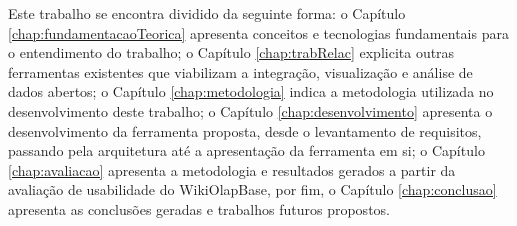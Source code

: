 Este trabalho se encontra dividido da seguinte forma: o Capítulo 
\ref{chap:fundamentacaoTeorica} apresenta conceitos e tecnologias fundamentais para o 
entendimento do trabalho; o Capítulo \ref{chap:trabRelac} explicita outras ferramentas 
existentes que viabilizam a integração, visualização e análise de dados abertos; o 
Capítulo \ref{chap:metodologia} indica a metodologia utilizada no desenvolvimento deste 
trabalho; o Capítulo \ref{chap:desenvolvimento} apresenta o desenvolvimento da ferramenta 
proposta, desde o levantamento de requisitos, passando pela arquitetura até a 
apresentação da ferramenta em si; o Capítulo \ref{chap:avaliacao} apresenta a metodologia e 
resultados gerados a partir da avaliação de usabilidade do WikiOlapBase, por fim, o Capítulo 
\ref{chap:conclusao} apresenta as conclusões geradas e trabalhos futuros propostos.